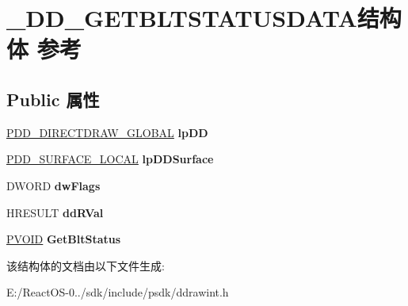 \hypertarget{struct___d_d___g_e_t_b_l_t_s_t_a_t_u_s_d_a_t_a}{}\section{\+\_\+\+D\+D\+\_\+\+G\+E\+T\+B\+L\+T\+S\+T\+A\+T\+U\+S\+D\+A\+T\+A结构体 参考}
\label{struct___d_d___g_e_t_b_l_t_s_t_a_t_u_s_d_a_t_a}
\subsection*{Public 属性}
\begin{DoxyCompactItemize}
\item 
\mbox{\label{struct___d_d___g_e_t_b_l_t_s_t_a_t_u_s_d_a_t_a_acb6a45c6a834f653f330196f323c3083}} 
\hyperlink{struct___d_d___d_i_r_e_c_t_d_r_a_w___g_l_o_b_a_l}{P\+D\+D\+\_\+\+D\+I\+R\+E\+C\+T\+D\+R\+A\+W\+\_\+\+G\+L\+O\+B\+AL} {\bfseries lp\+DD}
\item 
\mbox{\label{struct___d_d___g_e_t_b_l_t_s_t_a_t_u_s_d_a_t_a_acd9b03af9350673bf6cf9ded619c6ed0}} 
\hyperlink{struct___d_d___s_u_r_f_a_c_e___l_o_c_a_l}{P\+D\+D\+\_\+\+S\+U\+R\+F\+A\+C\+E\+\_\+\+L\+O\+C\+AL} {\bfseries lp\+D\+D\+Surface}
\item 
\mbox{\label{struct___d_d___g_e_t_b_l_t_s_t_a_t_u_s_d_a_t_a_a36fde416b06be255c17c33e4cf315c69}} 
D\+W\+O\+RD {\bfseries dw\+Flags}
\item 
\mbox{\label{struct___d_d___g_e_t_b_l_t_s_t_a_t_u_s_d_a_t_a_a40985109c981a96873c5114f37b488d1}} 
H\+R\+E\+S\+U\+LT {\bfseries dd\+R\+Val}
\item 
\mbox{\label{struct___d_d___g_e_t_b_l_t_s_t_a_t_u_s_d_a_t_a_a310eca2e86a2b6276cb6e715a9bf4822}} 
\hyperlink{interfacevoid}{P\+V\+O\+ID} {\bfseries Get\+Blt\+Status}
\end{DoxyCompactItemize}


该结构体的文档由以下文件生成\+:\begin{DoxyCompactItemize}
\item 
E\+:/\+React\+O\+S-\/0../sdk/include/psdk/ddrawint.\+h\end{DoxyCompactItemize}
